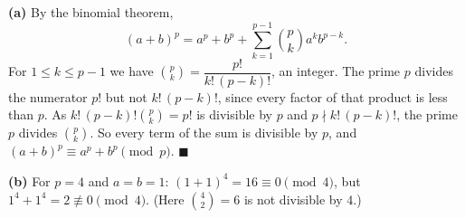 \textbf{(a)} By the binomial theorem,
\[
(a+b)^p=a^p+b^p+\sum_{k=1}^{p-1}\binom pk a^kb^{p-k}.
\]
For $1\le k\le p-1$ we have $\binom pk=\dfrac{p!}{k!\,(p-k)!}$, an integer. The prime $p$ divides the numerator $p!$ but not $k!\,(p-k)!$, since every factor of that product is less than $p$. As $k!\,(p-k)!\binom pk=p!$ is divisible by $p$ and $p\nmid k!\,(p-k)!$, the prime $p$ divides $\binom pk$. So every term of the sum is divisible by $p$, and $(a+b)^p\equiv a^p+b^p\pmod p$. $\blacksquare$

\textbf{(b)} For $p=4$ and $a=b=1$: $(1+1)^4=16\equiv0\pmod4$, but $1^4+1^4=2\not\equiv0\pmod4$. (Here $\binom42=6$ is not divisible by $4$.)
